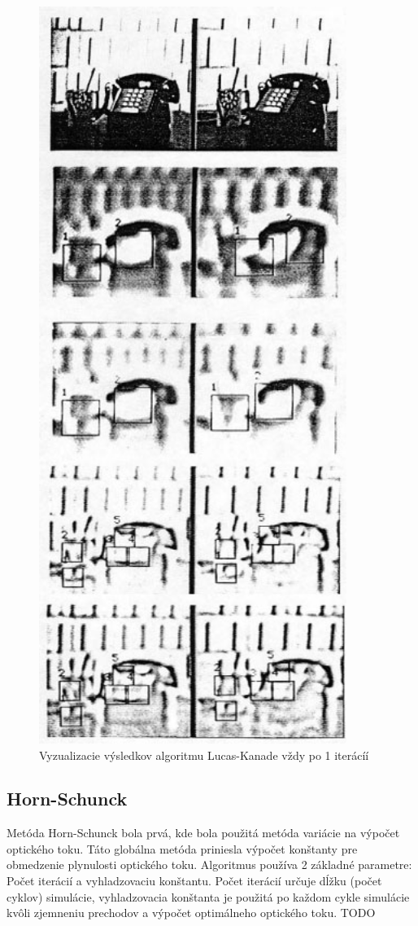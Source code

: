 \begin{figure}[H]
  \centering
  \includegraphics[width=10cm]{pics/lukas-kanade.jpg}
  \caption{Vyzualizacie výsledkov algoritmu Lucas-Kanade vždy po 1 iterácíí}
\end{figure}
\vspace{10mm}

\subsection{Horn-Schunck}
Metóda Horn-Schunck bola prvá, kde bola použitá metóda variácie na výpočet optického toku. Táto globálna metóda priniesla výpočet  konštanty pre obmedzenie plynulosti optického toku. Algoritmus používa 2 základné parametre: Počet iterácií a vyhladzovaciu konštantu. Počet iterácií určuje dĺžku (počet cyklov) simulácie, vyhladzovacia konštanta je použitá po každom cykle simulácie kvôli zjemneniu prechodov a výpočet optimálneho optického toku. TODO

